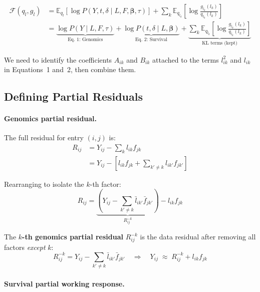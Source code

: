 \documentclass[11pt]{article}
\newcommand{\lbar}[2]{\bar{l}_{#1#2}}
\newcommand{\fbar}[2]{\bar{f}_{#1#2}}
\begin{document}
\begin{align}
  \mathcal{F}(q_l, g_l)
  &= \mathbb{E}_{q_l}\!\left[\log P(Y, t, \delta \mid L, F, \bm{\beta}, \tau)\right]
    + \sum_k \mathbb{E}_{q_{l_k}}\!\left[\log\frac{g_{l_k}(l_k)}{q_{l_k}(l_k)}\right]
  \label{eq:Fql-a}\\
  &= \underbrace{\log P(Y \mid L, F, \tau)}_{\text{Eq.\ 1: Genomics}}
    + \underbrace{\log P(t, \delta \mid L, \bm{\beta})}_{\text{Eq.\ 2: Survival}}
    + \underbrace{\sum_k \mathbb{E}_{q_{l_k}}\!\left[\log\frac{g_{l_k}(l_k)}{q_{l_k}(l_k)}\right]}_{\text{KL terms (kept)}}
  \label{eq:Fql-b}
\end{align}

We need to identify the coefficients $A_{ik}$ and $B_{ik}$ attached to the
terms $l_{ik}^2$ and $l_{ik}$ in Equations~1 and~2, then combine them.

\subsection{Defining Partial Residuals}

\paragraph{Genomics partial residual.}
The full residual for entry $(i,j)$ is:
\begin{align}
  R_{ij} &= Y_{ij} - \sum_k l_{ik}f_{jk} \label{eq:full-resid}\\
         &= Y_{ij} - \left[l_{ik}f_{jk} + \sum_{k'\neq k}l_{ik'}f_{jk'}\right]
         \label{eq:resid-split}
\end{align}

Rearranging to isolate the $k$-th factor:
\begin{equation}\label{eq:R-residual}
  R_{ij} = \underbrace{\left(Y_{ij} - \sum_{k'\neq k}\lbar{i}{k'}\fbar{j}{k'}\right)}_{R^{-k}_{ij}}
           - l_{ik}f_{jk}
\end{equation}

The \textbf{$k$-th genomics partial residual} $R^{-k}_{ij}$ is the data residual
after removing all factors \emph{except} $k$:
\begin{equation}
  R^{-k}_{ij} = Y_{ij} - \sum_{k'\neq k}\lbar{i}{k'}\fbar{j}{k'}
  \quad\Rightarrow\quad
  Y_{ij} \;\approx\; R^{-k}_{ij} + l_{ik}f_{jk}
\end{equation}

\paragraph{Survival partial working response.}
\end{document}
